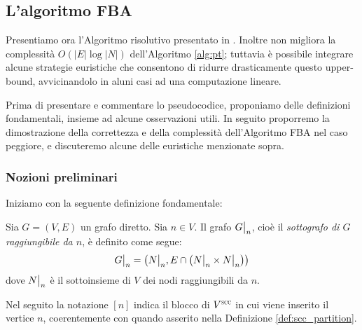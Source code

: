 \subsection{L'algoritmo FBA}
Presentiamo ora l'Algoritmo risolutivo presentato in \cite{dovier}. Inoltre non migliora la complessità $O(|E| \log |N|)$ dell'Algoritmo \ref{alg:pt}; tuttavia è possibile integrare alcune strategie euristiche che consentono di ridurre drasticamente questo upper-bound, avvicinandolo in aluni casi ad una computazione lineare.

Prima di presentare e commentare lo pseudocodice, proponiamo delle definizioni fondamentali, insieme ad alcune osservazioni utili. In seguito proporremo la dimostrazione della correttezza e della complessità dell'Algoritmo FBA nel caso peggiore, e discuteremo alcune delle euristiche menzionate sopra.

\subsubsection{Nozioni preliminari}
Iniziamo con la seguente definizione fondamentale:
\begin{definition}
    \label{def:grafo_restr}
    Sia $G = (V,E)$ un grafo diretto. Sia $n \in V$. Il grafo $\restr{G}{n}$, cioè il \emph{sottografo di $G$ raggiungibile da $n$}, è definito come segue:
    \begin{gather*}
        \restr{G}{n} = \left(\restr{N}{n}, E \cap \left(\restr{N}{n} \times \restr{N}{n}\right)\right)
    \end{gather*}
    dove $\restr{N}{n}$ è il sottoinsieme di $V$ dei nodi raggiungibili da $n$.
\end{definition}
Nel seguito la notazione $[n]$ indica il blocco di $V^{\superscc}$ in cui viene inserito il vertice $n$, coerentemente con quando asserito nella Definizione \ref{def:scc_partition}.

